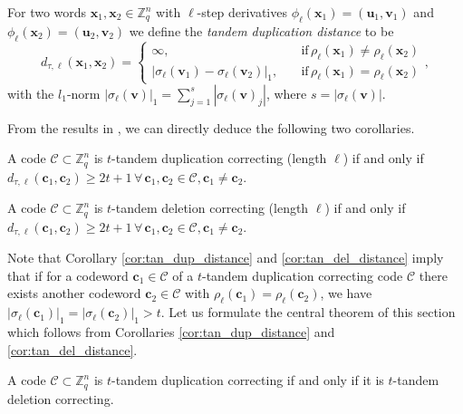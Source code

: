 \documentclass[a4paper]{llncs}
\newcommand{\ve}[1]{\boldsymbol{#1}}
\begin{document}
	\begin{definition}
		For two words $\ve{x}_1, \ve{x}_2 \in \mathbb{Z}_q^n$ with $\ell$-step derivatives $\phi_\ell(\ve{x}_1) = (\ve{u}_1, \ve{v}_1)$ and $\phi_\ell(\ve{x}_2) = (\ve{u}_2, \ve{v}_2)$ we define the \emph{tandem duplication distance} to be
		\begin{equation}
		d_{\tau, \ell}(\ve{x}_1, \ve{x}_2) = \left\{ \begin{array}{ll}
		\infty, & \mathrm{if} \, \rho_\ell(\ve{x}_1) \neq \rho_\ell(\ve{x}_2) \\
		|\sigma_\ell(\ve{v}_1) - \sigma_\ell(\ve{v}_2)|_1, \quad & \mathrm{if} \, \rho_\ell(\ve{x}_1) = \rho_\ell(\ve{x}_2)
		\end{array} \right.,
		\end{equation}
		with the $l_1$-norm $|\sigma_\ell(\ve{v})|_1 = \sum_{j=1}^{s}|\sigma_\ell(\ve{v})_j|$, where $s=| \sigma_\ell(\ve{v}) |$.
	\end{definition}
	From the results in \cite{Jain16}, we can directly deduce the following two corollaries.
	\begin{corollary} \label{cor:tan_dup_distance}
		A code $\mathcal{C} \subset \mathbb{Z}_q^n$ is $t$-tandem duplication correcting (length $\ell$) if and only if $d_{\tau, \ell}(\ve{c}_1, \ve{c}_2) \geq 2t+1 \,\forall\, \ve{c}_1, \ve{c}_2 \in \mathcal{C}, \ve{c}_1 \neq \ve{c}_2$.
	\end{corollary}
	\begin{corollary} \label{cor:tan_del_distance}
		A code $\mathcal{C} \subset \mathbb{Z}_q^n$ is $t$-tandem deletion correcting (length $\ell$) if and only if $d_{\tau, \ell}(\ve{c}_1, \ve{c}_2) \geq 2t+1 \,\forall\, \ve{c}_1, \ve{c}_2 \in \mathcal{C}, \ve{c}_1 \neq \ve{c}_2$.
	\end{corollary}
	Note that Corollary \ref{cor:tan_dup_distance} and \ref{cor:tan_del_distance} imply that if for a codeword $\ve{c}_1 \in \mathcal{C}$ of a $t$-tandem duplication correcting code $\mathcal{C}$ there exists another codeword $\ve{c}_2 \in \mathcal{C}$ with $\rho_\ell(\ve{c}_1) = \rho_\ell(\ve{c}_2)$, we have $|\sigma_\ell(\ve{c}_1)|_1 = |\sigma_\ell(\ve{c}_2)|_1 > t$. Let us formulate the central theorem of this section which follows from Corollaries \ref{cor:tan_dup_distance} and \ref{cor:tan_del_distance}.
	\begin{theorem} \label{thm:equivalence_tandem_duplication_deletion}
		A code $\mathcal{C} \subset \mathbb{Z}_q^n$ is $t$-tandem duplication correcting if and only if it is $t$-tandem deletion correcting.
	\end{theorem}
\end{document}
